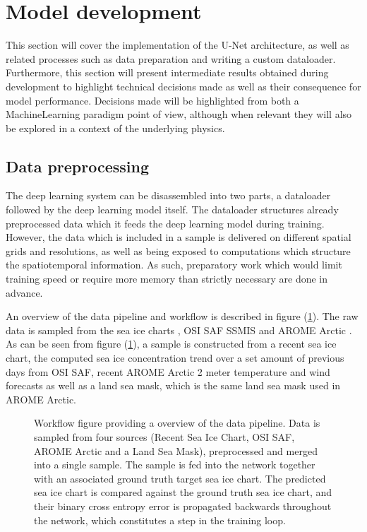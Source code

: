 \documentclass[../main/thesis]{subfiles}
\begin{document}
\section{Model development}
\label{sec:developing a unet}
This section will cover the implementation of the U-Net architecture, as well as related processes such as data preparation and writing a custom dataloader. Furthermore, this section will present intermediate results obtained during development to highlight technical decisions made as well as their consequence for model performance. Decisions made will be highlighted from both a MachineLearning paradigm point of view, although when relevant they will also be explored in a context of the underlying physics.

\subsection{Data preprocessing}
The deep learning system can be disassembled into two parts, a dataloader followed by the deep learning model itself. The dataloader structures already preprocessed data which it feeds the deep learning model during training. However, the data which is included in a sample is delivered on different spatial grids and resolutions, as well as being exposed to computations which structure the spatiotemporal information. As such, preparatory work which would limit training speed or require more memory than strictly necessary are done in advance.

An overview of the data pipeline and workflow is described in figure (\ref{fig:data_pipeline}). The raw data is sampled from the sea ice charts \citep{Dinessen2020}, OSI SAF SSMIS \citep{Tonboe2017} and AROME Arctic \citep{Mueller2017}. As can be seen from figure (\ref{fig:data_pipeline}), a sample is constructed from a recent sea ice chart, the computed sea ice concentration trend over a set amount of previous days from OSI SAF, recent AROME Arctic 2 meter temperature and wind forecasts as well as a land sea mask, which is the same land sea mask used in AROME Arctic.

\begin{figure}
    \centering
    
    \caption{\label{fig:data_pipeline} Workflow figure providing a overview of the data pipeline. Data is sampled from four sources (Recent Sea Ice Chart, OSI SAF, AROME Arctic and a Land Sea Mask), preprocessed and merged into a single sample. The sample is fed into the network  together with an associated ground truth target sea ice chart. The predicted sea ice chart is compared against the ground truth sea ice chart, and their binary cross entropy error is propagated backwards throughout the network, which constitutes a step in the training loop.}
\end{figure}
\end{document}
